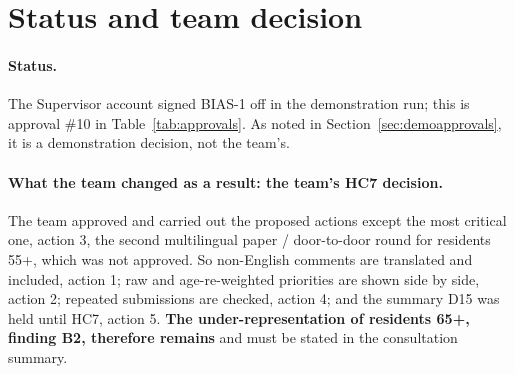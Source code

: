 \section{Status and team decision}

\paragraph*{Status.} The Supervisor account signed BIAS-1 off in the demonstration run; this is approval \#10 in Table~\ref{tab:approvals}. As noted in Section~\ref{sec:demoapprovals}, it is a demonstration decision, not the team's.

\paragraph*{What the team changed as a result: the team's HC7 decision.} The team approved and carried out the proposed actions except the most critical one, action 3, the second multilingual paper / door-to-door round for residents 55+, which was not approved. So non-English comments are translated and included, action 1; raw and age-re-weighted priorities are shown side by side, action 2; repeated submissions are checked, action 4; and the summary D15 was held until HC7, action 5. \textbf{The under-representation of residents 65+, finding B2, therefore remains} and must be stated in the consultation summary.
